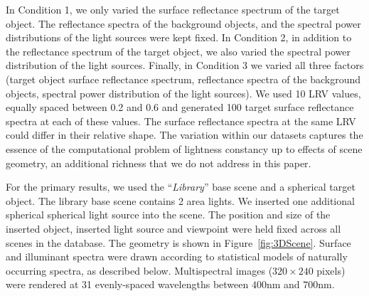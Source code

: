 \documentclass{jov}
\begin{document}
In Condition 1, we only varied the surface reflectance spectrum of the target object.
The reflectance spectra of the background objects, and the spectral power distributions of the light sources were kept fixed.
In Condition 2, in addition to the reflectance spectrum of the target object,
we also varied the spectral power distribution of the light sources.
Finally, in Condition 3 we varied all three factors (target object surface 
reflectance spectrum, reflectance spectra of the background objects, 
spectral power distribution of the light sources).
We used 10 LRV values, equally spaced between 0.2 and 0.6 and generated 100 target surface reflectance spectra at each of these values. 
The surface reflectance spectra at the same LRV could differ in their relative shape.
The variation within our datasets captures the essence of the computational problem of lightness constancy
up to effects of scene geometry, an additional richness that we do not address in this paper.

For the primary results, we used the ``{\it Library}'' base scene and a spherical target object.
The library base scene contains 2 area lights. 
We inserted one additional spherical spherical light source into the scene.
The position and size of the inserted object, inserted light source and viewpoint were held fixed across all 
scenes in the database. The geometry is shown in Figure~\ref{fig:3DScene}.
Surface and illuminant spectra were drawn according to statistical models of naturally occurring spectra, as described below.
Multispectral images ($320 \times 240$ pixels) were rendered at 31 evenly-spaced wavelengths between $400$nm and $700$nm.
\end{document}
